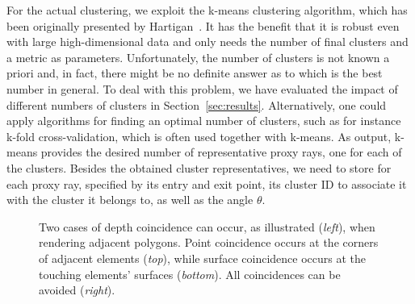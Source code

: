 \documentclass[journal]{vgtc}                %
\begin{document}
For the actual clustering, we exploit the k-means clustering algorithm, which has been originally presented by Hartigan~\cite{hartigan75kmeans}. It has the benefit that it is robust even with large high-dimensional data and only needs the number of final clusters and a metric as parameters. Unfortunately, the number of clusters is not known a priori and, in fact, there might be no definite answer as to which is the best number in general. To deal with this problem, we have evaluated the impact of different numbers of clusters in Section~\ref{sec:results}. Alternatively, one could apply algorithms for finding an optimal number of clusters, such as for instance k-fold cross-validation, which is often used together with k-means. As output, k-means provides the desired number of representative proxy rays, one for each of the clusters. Besides the obtained cluster representatives, we need to store for each proxy ray, specified by its entry and exit point, its cluster ID to associate it with the cluster it belongs to, as well as the angle $\theta$.
%
\begin{figure}[b]
  \centering
      \centering 
  \caption{Two cases of depth coincidence can occur, as illustrated ({\it left}), when rendering adjacent polygons. Point coincidence occurs at the corners of adjacent elements ({\it top}), while surface coincidence occurs at the touching elements' surfaces ({\it bottom}). All coincidences can be avoided ({\it right}).}  
  \label{fig:depthcoincidence}
\end{figure}
\end{document}
